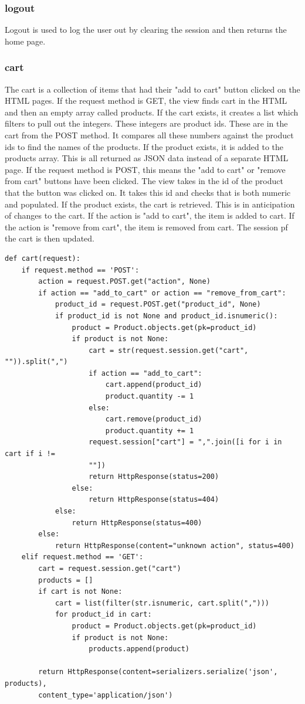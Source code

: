 \subsubsection{logout}
Logout is used to log the user out by clearing the session and then returns the home page.
\subsubsection{cart}
The cart is a collection of items that had their "add to cart" button clicked on the HTML pages.
If the request method is GET, the view finds cart in the HTML and then an empty array called products. If the cart exists, it creates a list which filters to pull out the integers. These integers are product ids. These are in the cart from the POST method. It compares all these numbers against the product ids to find the names of the products. If the product exists, it is added to the products array. This is all returned as JSON data instead of a separate HTML page.
If the request method is POST, this means the "add to cart" or "remove from cart" buttons have been clicked. The view takes in the id of the product that the button was clicked on. It takes this id and checks that is both numeric and populated. If the product exists, the cart is retrieved. This is in anticipation of changes to the cart. If the action is "add to cart", the item is added to cart. If the action is "remove from cart", the item is removed from cart. The session pf the cart is then updated.
\begin{verbatim}
def cart(request):
    if request.method == 'POST':
        action = request.POST.get("action", None)
        if action == "add_to_cart" or action == "remove_from_cart":
            product_id = request.POST.get("product_id", None)
            if product_id is not None and product_id.isnumeric():
                product = Product.objects.get(pk=product_id)
                if product is not None:
                    cart = str(request.session.get("cart", "")).split(",")
                    if action == "add_to_cart":
                        cart.append(product_id)
                        product.quantity -= 1
                    else:
                        cart.remove(product_id)
                        product.quantity += 1
                    request.session["cart"] = ",".join([i for i in cart if i != 
                    ""])
                    return HttpResponse(status=200)
                else:
                    return HttpResponse(status=404)
            else:
                return HttpResponse(status=400)
        else:
            return HttpResponse(content="unknown action", status=400)
    elif request.method == 'GET':
        cart = request.session.get("cart")
        products = []
        if cart is not None:
            cart = list(filter(str.isnumeric, cart.split(",")))
            for product_id in cart:
                product = Product.objects.get(pk=product_id)
                if product is not None:
                    products.append(product)

        return HttpResponse(content=serializers.serialize('json', products), 
        content_type='application/json')
    
\end{verbatim}

